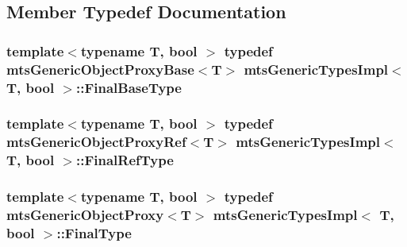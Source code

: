 \subsection{Member Typedef Documentation}
\hypertarget{classmts_generic_types_impl_a7997b5c3162967dd9f29b33ef5f1858a}{
\subsubsection[{Final\-Base\-Type}]{\setlength{\rightskip}{0pt plus 5cm}template$<$typename T, bool $>$ typedef {\bf mts\-Generic\-Object\-Proxy\-Base}$<$T$>$ {\bf mts\-Generic\-Types\-Impl}$<$ T, bool $>$\-::{\bf Final\-Base\-Type}}}\label{classmts_generic_types_impl_a7997b5c3162967dd9f29b33ef5f1858a}
\hypertarget{classmts_generic_types_impl_a9f668541e03e4b56b77f94fa09ffbe96}{
\subsubsection[{Final\-Ref\-Type}]{\setlength{\rightskip}{0pt plus 5cm}template$<$typename T, bool $>$ typedef {\bf mts\-Generic\-Object\-Proxy\-Ref}$<$T$>$ {\bf mts\-Generic\-Types\-Impl}$<$ T, bool $>$\-::{\bf Final\-Ref\-Type}}}\label{classmts_generic_types_impl_a9f668541e03e4b56b77f94fa09ffbe96}
\hypertarget{classmts_generic_types_impl_ad04e0f563e98adbcac5647ea821f4100}{
\subsubsection[{Final\-Type}]{\setlength{\rightskip}{0pt plus 5cm}template$<$typename T, bool $>$ typedef {\bf mts\-Generic\-Object\-Proxy}$<$T$>$ {\bf mts\-Generic\-Types\-Impl}$<$ T, bool $>$\-::{\bf Final\-Type}}}\label{classmts_generic_types_impl_ad04e0f563e98adbcac5647ea821f4100}



